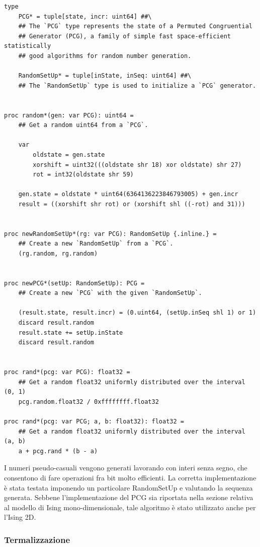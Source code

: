\begin{verbatim}
type 
    PCG* = tuple[state, incr: uint64] ##\
    ## The `PCG` type represents the state of a Permuted Congruential 
    ## Generator (PCG), a family of simple fast space-efficient statistically 
    ## good algorithms for random number generation.

    RandomSetUp* = tuple[inState, inSeq: uint64] ##\
    ## The `RandomSetUp` type is used to initialize a `PCG` generator.


proc random*(gen: var PCG): uint64 =
    ## Get a random uint64 from a `PCG`.

    var 
        oldstate = gen.state
        xorshift = uint32(((oldstate shr 18) xor oldstate) shr 27)
        rot = int32(oldstate shr 59)

    gen.state = oldstate * uint64(6364136223846793005) + gen.incr
    result = ((xorshift shr rot) or (xorshift shl ((-rot) and 31)))


proc newRandomSetUp*(rg: var PCG): RandomSetUp {.inline.} = 
    ## Create a new `RandomSetUp` from a `PCG`.
    (rg.random, rg.random)


proc newPCG*(setUp: RandomSetUp): PCG = 
    ## Create a new `PCG` with the given `RandomSetUp`.

    (result.state, result.incr) = (0.uint64, (setUp.inSeq shl 1) or 1)
    discard result.random
    result.state += setUp.inState
    discard result.random


proc rand*(pcg: var PCG): float32 =
    ## Get a random float32 uniformly distributed over the interval (0, 1)
    pcg.random.float32 / 0xffffffff.float32

proc rand*(pcg: var PCG; a, b: float32): float32 =
    ## Get a random float32 uniformly distributed over the interval (a, b)
    a + pcg.rand * (b - a)
\end{verbatim}    

I numeri pseudo-casuali vengono generati lavorando con interi senza segno, che consentono di fare operazioni fra bit molto efficienti. 
La corretta implementazione è stata testata imponendo un particolare RandomSetUp e valutando la sequenza generata. Sebbene l'implementazione 
del PCG sia riportata nella sezione relativa al modello di Ising mono-dimensionale, tale algoritmo è stato utilizzato anche per l'Ising 2D.



\subsubsection{Termalizzazione}

